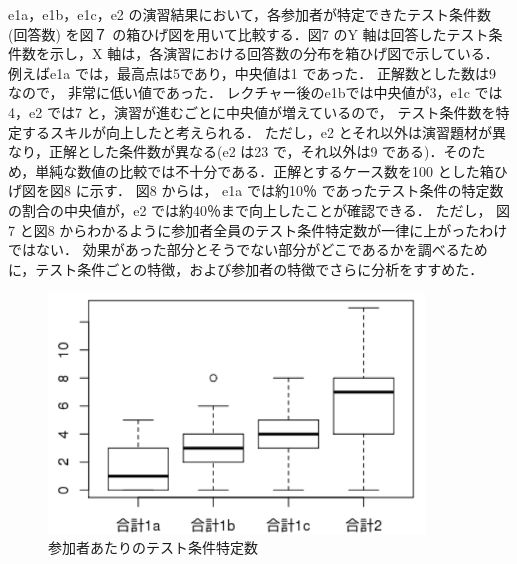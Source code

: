 \documentclass[a4paper,11pt]{jreport}
\begin{document}
 e1a，e1b，e1c，e2 の演習結果において，各参加者が特定できたテスト条件数 (回答数) を図７ の箱ひげ図を用いて比較する．図7 のY 軸は回答したテスト条件数を示し，X 軸は，各演習における回答数の分布を箱ひげ図で示している． 例えばe1a では，最高点は5であり，中央値は1 であった． 正解数とした数は9 なので， 非常に低い値であった． レクチャー後のe1bでは中央値が3，e1c では4，e2 では7 と，演習が進むごとに中央値が増えているので， テスト条件数を特定するスキルが向上したと考えられる．
 ただし，e2 とそれ以外は演習題材が異なり，正解とした条件数が異なる(e2 は23 で，それ以外は9 である)．そのため，単純な数値の比較では不十分である．正解とするケース数を100 とした箱ひげ図を図8 に示す．
 図8 からは， e1a では約10％ であったテスト条件の特定数の割合の中央値が，e2 では約40％まで向上したことが確認できる． ただし， 図7 と図8 からわかるように参加者全員のテスト条件特定数が一律に上がったわけではない． 効果があった部分とそうでない部分がどこであるかを調べるために，テスト条件ごとの特徴，および参加者の特徴でさらに分析をすすめた．

\begin{figure}[h]
  \begin{center}
  \includegraphics[width=10cm]{./image/D-3-Fig10.png}
  \caption{参加者あたりのテスト条件特定数}
  \label{fig:D-3-Fig10}
  \end{center}
   \end{figure}
\end{document}
